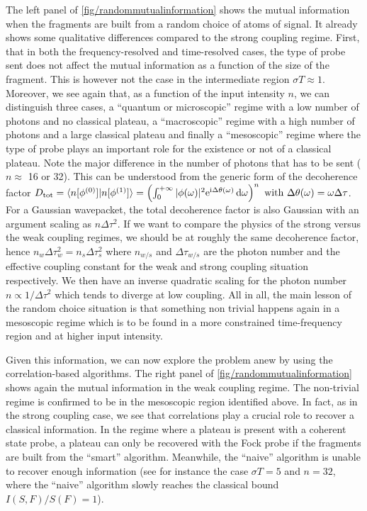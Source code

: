 The left panel of \cref{fig/randommutualinformation} 
shows the mutual information when the fragments
are built from a random choice of atoms of signal. It already shows
some qualitative differences compared to the strong coupling regime.
First, that in both the frequency-resolved and time-resolved cases,
the type of probe sent does not affect the mutual information as a
function of the size  of the fragment. This is however not the case in the
intermediate region $\sigma T \approx 1$. Moreover, we see again
that, as a function of the input intensity $n$, we can distinguish
three cases, a ``quantum or microscopic'' regime with a low number of 
photons and no classical plateau, a ``macroscopic'' regime with a 
high number of photons and a large classical plateau  and finally
a ``mesoscopic'' regime where the type of probe plays an important
role for the existence or not of a classical plateau. Note the major
difference in the number of photons that has to be sent ($n \approx$ 16 or 32).
This can be understood from the generic form of the decoherence
factor 
%
$D_{\text{tot}} = \langle n[\phi^{(0)}] | n[\phi^{(1)}] \rangle
= 
	\left(
	\int_0^{+\infty} 
		|\phi(\omega)|^2 \mathrm{e}^{\mathrm{i}\Delta\theta(\omega)}
	\,\mathrm{d}\omega
	\right)^n
\text{ with }
\Delta\theta(\omega)  = \omega\Delta\tau$. For a Gaussian
wavepacket, the total decoherence factor is also Gaussian with
an argument scaling as $n \Delta\tau^2$. If we want to compare
the physics of the strong versus the weak coupling regimes, we should
be at roughly the same decoherence factor, hence 
$n_w \Delta\tau_w^2 = n_s \Delta\tau_s^2$ where $n_{w/s}$ and
$\Delta\tau_{w/s}$ are the photon number and the effective 
coupling constant for the weak and strong coupling situation respectively.
We then have an inverse quadratic scaling for the photon number
$n \propto 1/\Delta\tau^2$ which tends to diverge at low coupling.
All in all, the main lesson of the random choice situation is that
something non trivial happens again in a mesoscopic regime which
is to be found in a more constrained time-frequency region and at
higher input intensity. 

Given this information, we can now explore the problem anew
by using the correlation-based algorithms. The right panel
of \cref{fig/randommutualinformation} shows again the mutual
information in the weak coupling regime. The non-trivial regime
is confirmed to be in the mesoscopic region identified above. 
In fact, as in the strong coupling case, we see that correlations
play a crucial role to recover a classical information. In the 
regime where a plateau is present with a coherent state probe, 
a plateau can only be recovered with the Fock probe if the fragments
are built from the ``smart'' algorithm. Meanwhile, the ``naive''
algorithm is unable to recover enough information (see for
instance the case $\sigma T = 5$ and $n=32$, where the ``naive''
algorithm slowly reaches the classical bound $I(S,F)/S(F) =1$).

